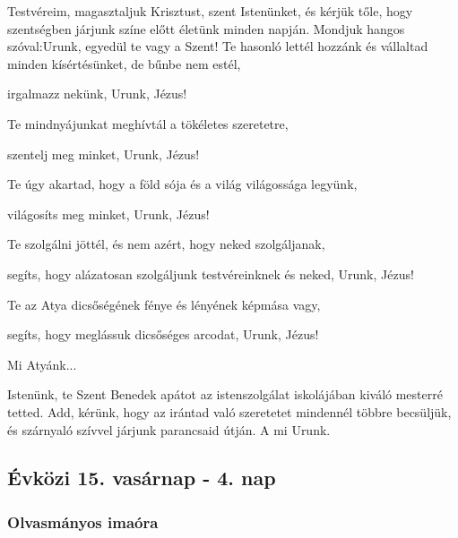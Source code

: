 \documentclass[twoside]{article}
\begin{document}
\begin{preces}{Testvéreim, magasztaljuk Krisztust, szent Istenünket, és kérjük tőle, hogy szentségben járjunk színe előtt életünk minden napján. Mondjuk hangos szóval:}{Urunk, egyedül te vagy a Szent!}
  Te hasonló lettél hozzánk és vállaltad minden kísértésünket, de bűnbe nem estél,

  \reddash irgalmazz nekünk, Urunk, Jézus!

  Te mindnyájunkat meghívtál a tökéletes szeretetre,

  \reddash szentelj meg minket, Urunk, Jézus!

  Te úgy akartad, hogy a föld sója és a világ világossága legyünk,

  \reddash világosíts meg minket, Urunk, Jézus!

  Te szolgálni jöttél, és nem azért, hogy neked szolgáljanak,

  \reddash segíts, hogy alázatosan szolgáljunk testvéreinknek és neked, Urunk, Jézus!

  Te az Atya dicsőségének fénye és lényének képmása vagy,

  \reddash segíts, hogy meglássuk dicsőséges arcodat, Urunk, Jézus!
\end{preces}
Mi Atyánk...

Istenünk, te Szent Benedek apátot az istenszolgálat iskolájában kiváló mesterré tetted. Add, kérünk, hogy az irántad való szeretetet mindennél többre becsüljük, és szárnyaló szívvel járjunk parancsaid útján. A mi Urunk.

\subsection*{Évközi 15. vasárnap - 4. nap}



\subsubsection*{Olvasmányos imaóra}


\end{document}
